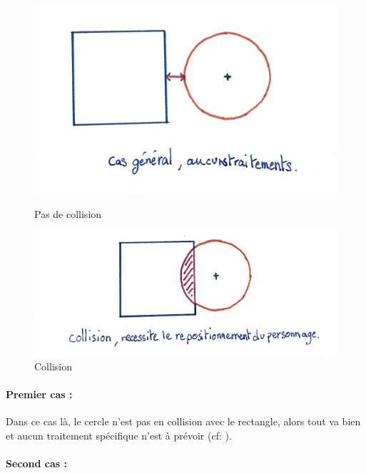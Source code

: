 \documentclass[11pt]{article}
\begin{document}
\begin{figure}
	\begin{minipage}{0.48\textwidth}
		\includegraphics[width=\linewidth]{image/fig2.jpg}
		\caption{Pas de collision}
		\label{fig:pas_de_collision}
	\end{minipage}
	\begin{minipage}{0.48\textwidth}
		\includegraphics[width=\linewidth]{image/fig3.jpg}
		\caption{Collision}
		\label{fig:collision}
	\end{minipage}
\end{figure}

\paragraph{Premier cas :} 


Dans ce cas là, le cercle n'est pas en collision avec le rectangle, alors 
tout va bien et aucun traitement spécifique n'est à prévoir (cf: ). 

\paragraph{Second cas :} 
\end{document}
